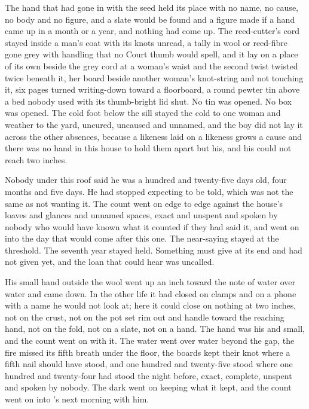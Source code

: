 The hand that had gone in with the seed held its place with no name, no cause, no body and no figure, and a slate would be found and a figure made if a hand came up in a month or a year, and nothing had come up. The reed-cutter's cord stayed inside a man's coat with its knots unread, a tally in wool or reed-fibre gone grey with handling that no Court thumb would spell, and it lay on a place of its own beside the grey cord at a woman's waist and the second twist twisted twice beneath it, her board beside another woman's knot-string and not touching it, six pages turned writing-down toward a floorboard, a round pewter tin above a bed nobody used with its thumb-bright lid shut. No tin was opened. No box was opened. The cold foot below the sill stayed the cold to one woman and weather to the yard, uncured, uncaused and unnamed, and the boy did not lay it across the other absences, because a likeness laid on a likeness grows a cause and there was no hand in this house to hold them apart but his, and his could not reach two inches.

Nobody under this roof said he was a hundred and twenty-five days old, four months and five days. He had stopped expecting to be told, which was not the same as not wanting it. The count went on edge to edge against the house's loaves and glances and unnamed spaces, exact and unspent and spoken by nobody who would have known what it counted if they had said it, and went on into the day that would come after this one. The near-saying stayed at the threshold. The seventh year stayed held. Something must give at its end and had not given yet, and the loan that could hear was uncalled.

His small hand outside the wool went up an inch toward the note of water over water and came down. In the other life it had closed on clamps and on a phone with a name he would not look at; here it could close on nothing at two inches, not on the crust, not on the pot set rim out and handle toward the reaching hand, not on the fold, not on a slate, not on a hand. The hand was his and small, and the count went on with it. The water went over water beyond the gap, the fire missed its fifth breath under the floor, the boards kept their knot where a fifth nail should have stood, and one hundred and twenty-five stood where one hundred and twenty-four had stood the night before, exact, complete, unspent and spoken by nobody. The dark went on keeping what it kept, and the count went on into 's next morning with him.
